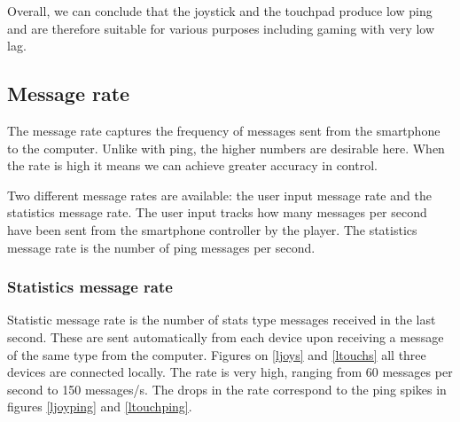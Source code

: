 \documentclass{l4proj}
\begin{document}
Overall, we can conclude that the joystick and the touchpad produce low ping and are therefore suitable for various purposes including gaming with very low lag. 


\subsection{Message rate}
The message rate captures the frequency of messages sent from the smartphone to the computer. Unlike with ping, the higher numbers are desirable here. When the rate is high it means we can achieve greater accuracy in control. \par 

Two different message rates are available: the user input message rate and the statistics message rate. The user input tracks how many messages per second have been sent from the smartphone controller by the player. 
The statistics message rate is the number of ping messages per second. \\

\subsubsection{Statistics message rate}
Statistic message rate is the number of stats type messages received in the last second. These are sent automatically from each device upon receiving a message of the same type from the computer. Figures on \ref{ljoys} and \ref{ltouchs} all three devices are connected locally. The rate is very high, ranging from 60 messages per second to 150 messages/s. The drops in the rate correspond to the ping spikes in figures \ref{ljoyping} and \ref{ltouchping}. \par
\end{document}

